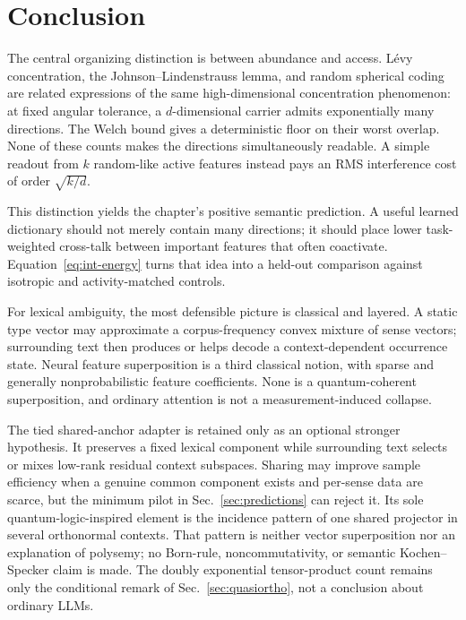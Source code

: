 \documentclass[
  aps,
  reprint,
  superscriptaddress,
  floatfix,
  nofootinbib,
  longbibliography
]{revtex4-2}
\begin{document}
\section{Conclusion}
\label{sec:conclusion}

The central organizing distinction is between abundance and access.
L\'evy concentration,
the Johnson--Lindenstrauss lemma, and random spherical coding are related
expressions of the same high-dimensional concentration phenomenon: at fixed
angular tolerance, a $d$-dimensional carrier admits exponentially many
directions.  The Welch bound gives a deterministic floor on their worst
overlap.  None of these counts makes the directions simultaneously readable.
A simple readout from $k$ random-like active features instead pays an RMS
interference cost of order $\sqrt{k/d}$.

This distinction yields the chapter's positive semantic prediction.  A useful
learned dictionary should not merely contain many directions; it should place
lower task-weighted cross-talk between important features that often
coactivate.  Equation~\eqref{eq:int-energy} turns that idea into a held-out
comparison against isotropic and activity-matched controls.

For lexical ambiguity, the most defensible picture is classical and layered.
A static type vector may approximate a corpus-frequency convex mixture of
sense vectors; surrounding text then produces or helps decode a
context-dependent occurrence state.  Neural feature superposition is a third
classical notion, with sparse and generally nonprobabilistic feature
coefficients.  None is a quantum-coherent superposition, and ordinary
attention is not a measurement-induced collapse.

The tied shared-anchor adapter is retained only as an optional stronger
hypothesis.  It preserves a fixed lexical component while surrounding text
selects or mixes low-rank residual context subspaces.  Sharing may improve
sample efficiency when a genuine common component exists and per-sense data
are scarce, but the minimum pilot in Sec.~\ref{sec:predictions} can reject it.
Its sole quantum-logic-inspired element is the incidence pattern of one shared
projector in several orthonormal contexts.  That pattern is neither vector
superposition nor an explanation of polysemy; no Born-rule,
noncommutativity, or semantic Kochen--Specker claim is made.
The doubly exponential tensor-product count remains only the conditional
remark of Sec.~\ref{sec:quasiortho}, not a conclusion about ordinary LLMs.
\end{document}

